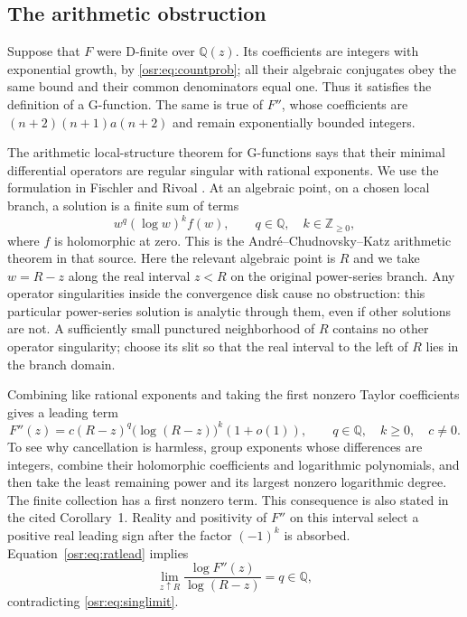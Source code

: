 \documentclass[11pt,letterpaper]{article}
\newcommand{\Q}{\mathbb Q}\newcommand{\R}{\mathbb R}\newcommand{\Z}{\mathbb Z}
\numberwithin{equation}{section}
\begin{document}
\subsection{The arithmetic obstruction}
Suppose that $F$ were D-finite over $\Q(z)$. Its coefficients are integers with exponential growth, by \eqref{osr:eq:countprob}; all their algebraic conjugates obey the same bound and their common denominators equal one. Thus it satisfies the definition of a G-function. The same is true of $F''$, whose coefficients are $(n+2)(n+1)a(n+2)$ and remain exponentially bounded integers.

The arithmetic local-structure theorem for G-functions says that their minimal differential operators are regular singular with rational exponents. We use the formulation in Fischler and Rivoal \cite[Definition 1, pp.~313--314; Theorem 6, pp.~328--329; Corollary 1, p.~329]{FR}. At an algebraic point, on a chosen local branch, a solution is a finite sum of terms
\[
 w^q(\log w)^k f(w),\qquad q\in\Q,\quad k\in\Z_{\ge0},
\]
where $f$ is holomorphic at zero. This is the Andr\'e--Chudnovsky--Katz arithmetic theorem in that source. Here the relevant algebraic point is $R$ and we take $w=R-z$ along the real interval $z<R$ on the original power-series branch. Any operator singularities inside the convergence disk cause no obstruction: this particular power-series solution is analytic through them, even if other solutions are not. A sufficiently small punctured neighborhood of $R$ contains no other operator singularity; choose its slit so that the real interval to the left of $R$ lies in the branch domain.

Combining like rational exponents and taking the first nonzero Taylor coefficients gives a leading term
\begin{equation}\label{osr:eq:ratlead}
 F''(z)=c(R-z)^q\bigl(\log(R-z)\bigr)^k(1+o(1)),
 \qquad q\in\Q,\quad k\ge0,\quad c\ne0.
\end{equation}
To see why cancellation is harmless, group exponents whose differences are integers, combine their holomorphic coefficients and logarithmic polynomials, and then take the least remaining power and its largest nonzero logarithmic degree. The finite collection has a first nonzero term. This consequence is also stated in the cited Corollary~1. Reality and positivity of $F''$ on this interval select a positive real leading sign after the factor $(-1)^k$ is absorbed. Equation~\eqref{osr:eq:ratlead} implies
\[
 \lim_{z\uparrow R}\frac{\log F''(z)}{\log(R-z)}=q\in\Q,
\]
contradicting \eqref{osr:eq:singlimit}.
\end{document}
